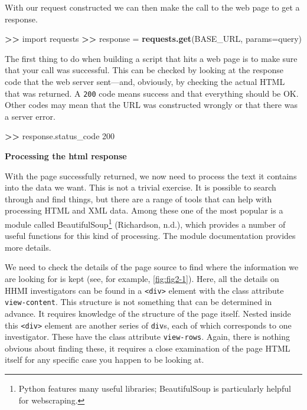 \documentclass[]{krantz}
\newenvironment{Shaded}{\begin{snugshade}}{\end{snugshade}}
\newcommand{\KeywordTok}[1]{\textcolor[rgb]{0.13,0.29,0.53}{\textbf{#1}}}
\newcommand{\DataTypeTok}[1]{\textcolor[rgb]{0.13,0.29,0.53}{#1}}
\newcommand{\DecValTok}[1]{\textcolor[rgb]{0.00,0.00,0.81}{#1}}
\newcommand{\StringTok}[1]{\textcolor[rgb]{0.31,0.60,0.02}{#1}}
\newcommand{\OperatorTok}[1]{\textcolor[rgb]{0.81,0.36,0.00}{\textbf{#1}}}
\newcommand{\ErrorTok}[1]{\textcolor[rgb]{0.64,0.00,0.00}{\textbf{#1}}}
\newcommand{\NormalTok}[1]{#1}
\begin{document}
With our request constructed we can then make the call to the web page
to get a response.

\begin{Shaded}
\begin{Highlighting}[]
\OperatorTok{>}\ErrorTok{>}\StringTok{ }\NormalTok{import requests}
\OperatorTok{>}\ErrorTok{>}\StringTok{ }\NormalTok{response =}\StringTok{ }\KeywordTok{requests.get}\NormalTok{(BASE_URL, }\DataTypeTok{params=}\NormalTok{query)}
\end{Highlighting}
\end{Shaded}

The first thing to do when building a script that hits a web page is to
make sure that your call was successful. This can be checked by looking
at the response code that the web server sent---and, obviously, by
checking the actual HTML that was returned. A \texttt{200} code means
success and that everything should be OK. Other codes may mean that the
URL was constructed wrongly or that there was a server error.

\begin{Shaded}
\begin{Highlighting}[]
\OperatorTok{>}\ErrorTok{>}\StringTok{ }\NormalTok{response.status_code}
\DecValTok{200}
\end{Highlighting}
\end{Shaded}

\textbf{Processing the html response}

With the page successfully returned, we now need to process the text it
contains into the data we want. This is not a trivial exercise. It is
possible to search through and find things, but there are a range of
tools that can help with processing HTML and XML data. Among these one
of the most popular is a module called BeautifulSoup\footnote{Python
  features many useful libraries; BeautifulSoup is particularly helpful
  for webscraping.} (Richardson, n.d.), which provides a number of
useful functions for this kind of processing. The module documentation
provides more details.

We need to check the details of the page source to find where the
information we are looking for is kept (see, for example,
\ref{fig:fig2-1}). Here, all the details on HHMI investigators can be
found in a \texttt{\textless{}div\textgreater{}} element with the class
attribute \texttt{view-content}. This structure is not something that
can be determined in advance. It requires knowledge of the structure of
the page itself. Nested inside this
\texttt{\textless{}div\textgreater{}} element are another series of
\texttt{div}s, each of which corresponds to one investigator. These have
the class attribute \texttt{view-rows}. Again, there is nothing obvious
about finding these, it requires a close examination of the page HTML
itself for any specific case you happen to be looking at.
\end{document}
